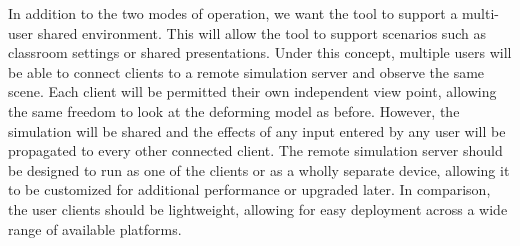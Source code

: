 In addition to the two modes of operation, we want the tool to support
a multi-user shared environment. This will allow the tool to support
scenarios such as classroom settings or shared presentations. Under
this concept, multiple users will be able to connect clients to a
remote simulation server and observe the same scene. Each client will
be permitted their own independent view point, allowing the same
freedom to look at the deforming model as before. However, the
simulation will be shared and the effects of any input entered by any
user will be propagated to every other connected client. The remote
simulation server should be designed to run as one of the clients or
as a wholly separate device, allowing it to be customized for
additional performance or upgraded later. In comparison, the user
clients should be lightweight, allowing for easy deployment across a
wide range of available platforms.







